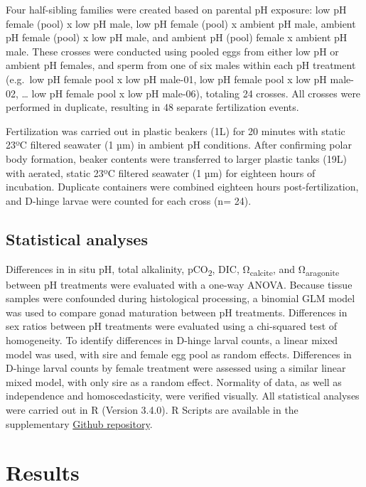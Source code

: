 \documentclass [11pt, proquest] {uwthesis}[2015/03/03]
\begin{document}
Four half-sibling families were created based on parental pH exposure: low pH female (pool) x low pH male, low pH female (pool) x ambient pH male, ambient pH female (pool) x low pH male, and ambient pH (pool) female x ambient pH male. These crosses were conducted using pooled eggs from either low pH or ambient pH females, and sperm from one of six males within each pH treatment (e.g.~low pH female pool x low pH male-01, low pH female pool x low pH male-02, \ldots{} low pH female pool x low pH male-06), totaling 24 crosses. All crosses were performed in duplicate, resulting in 48 separate fertilization events.

Fertilization was carried out in plastic beakers (1L) for 20 minutes with static 23ºC filtered seawater (1 µm) in ambient pH conditions. After confirming polar body formation, beaker contents were transferred to larger plastic tanks (19L) with aerated, static 23ºC filtered seawater (1 µm) for eighteen hours of incubation. Duplicate containers were combined eighteen hours post-fertilization, and D-hinge larvae were counted for each cross (n= 24).

\hypertarget{statistical-analyses}{%
\subsection{Statistical analyses}\label{statistical-analyses}}

Differences in in situ pH, total alkalinity, pCO\textsubscript{2}, DIC, Ω\textsubscript{calcite}, and Ω\textsubscript{aragonite} between pH treatments were evaluated with a one-way ANOVA. Because tissue samples were confounded during histological processing, a binomial GLM model was used to compare gonad maturation between pH treatments. Differences in sex ratios between pH treatments were evaluated using a chi-squared test of homogeneity. To identify differences in D-hinge larval counts, a linear mixed model was used, with sire and female egg pool as random effects. Differences in D-hinge larval counts by female treatment were assessed using a similar linear mixed model, with only sire as a random effect. Normality of data, as well as independence and homoscedasticity, were verified visually. All statistical analyses were carried out in R (Version 3.4.0). R Scripts are available in the supplementary \href{https://github.com/RobertsLab/paper-gigas-early-gametogenic-exposure}{Github repository}.

\hypertarget{results-1}{%
\section{Results}\label{results-1}}
\end{document}
